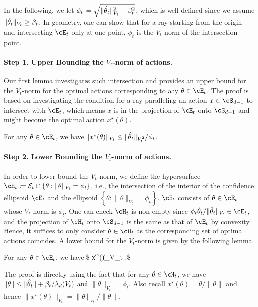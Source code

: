 In the following, we let
$
\phi_t	 \coloneqq \sqrt{ \|\hat{\theta}_t\|_{V_t}^2 - \beta_t^2 }
$, which is well-defined since we assume $\|\hat{\theta}_t\|_{V_t}  \geq \beta_t$. In geometry,  one can show that for a ray starting from the origin and intersecting $\cE_t$ only at one point, $\phi_t$ is the ${V_t}$-norm of the intersection point. 

\paragraph{Step 1. Upper Bounding the $V_t$-norm of actions.}
Our first lemma investigates such intersection and provides an upper bound for the  $V_t$-norm for the optimal actions corresponding to any $\theta\in \cE_t$. The proof is based on investigating the condition for a ray paralleling an action $x \in \cS_{d-1}$ to intersect with $\cE_t$, which means $x$ is in the projection of $\cE_t$ onto $\cS_{d-1}$ and might become the optimal action $x^\star(\theta)$. 


\begin{lemma}\label{lem:Vt_norm_upper}
For any $\theta\in \cE_t$, we have
	$
	\|x^\star(\theta )\|_{V_t} \leq  \|\hat{\theta}_t\|_{V_t^2}/\phi_t$.
\end{lemma}


   



\paragraph{Step 2. Lower Bounding the $V_t$-norm of actions.}

In order to lower bound the $V_t$-norm, we define the hypersurface  
$
\cH_t \coloneqq \mathcal{E}_t\cap\left\{\theta:\|\theta\|_{V_t}=\phi_t\right\}
$, 
i.e., the intersection of the interior of the confidence ellipsoid  $\cE_t$ and the ellipsoid $\left\{\theta:\|\theta\|_{V_t}=\phi_t\right\}$.
$\cH_t$  consists of $\theta \in \cE_t$ whose $V_t$-norm is $\phi_t$. One can check $\cH_t$ is non-empty since $ \phi_t  \hparam_t  /\|\hparam_t\|_{V_t}  \in \cE_t$, and  the projection of $\cH_t$  onto $\cS_{d-1}$ is the same as that of $\cE_t$ by convexity. Hence,  it suffices to only consider  $\theta \in \cH_t$ as the corresponding set of optimal actions coincides. A lower bound for the $V_t$-norm is given by the following lemma.



\begin{lemma}
\label{lem:Vt_norm_lower}
	For any $\theta\in \cE_t$, we have
	\$
	  \|x^\star(\theta )\|_{V_t} \geq {}.\$
\end{lemma}
The proof is directly using the fact that for any $ \theta \in \cH_t$, we have $\|\theta\| \leq \|\hat{\theta}_t\| +  \beta_t/\lambda_d(V_t)  $ and $\|\theta\|_{V_t}  =  \phi_t$. Also recall  $x^\star(\theta ) = \theta /\|\theta\|$ and hence $\|x^\star(\theta )\|_{V_t} =  \|\theta\|_{V_t} / \|\theta\|$. 










